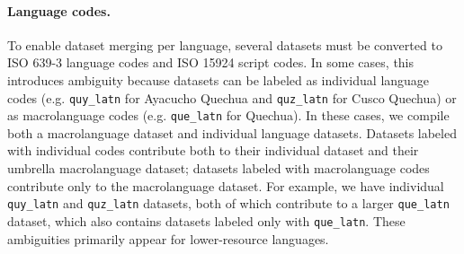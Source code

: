 \documentclass[11pt]{article}
\begin{document}
\paragraph{Language codes.}
To enable dataset merging per language, several datasets must be converted to ISO 639-3 language codes and ISO 15924 script codes.
In some cases, this introduces ambiguity because datasets can be labeled as individual language codes (e.g. \texttt{quy\_latn} for Ayacucho Quechua and \texttt{quz\_latn} for Cusco Quechua) or as macrolanguage codes (e.g. \texttt{que\_latn} for Quechua).
In these cases, we compile both a macrolanguage dataset and individual language datasets.
Datasets labeled with individual codes contribute both to their individual dataset and their umbrella macrolanguage dataset; datasets labeled with macrolanguage codes contribute only to the macrolanguage dataset.
For example, we have individual \texttt{quy\_latn} and \texttt{quz\_latn} datasets, both of which contribute to a larger \texttt{que\_latn} dataset, which also contains datasets labeled only with \texttt{que\_latn}.
These ambiguities primarily appear for lower-resource languages.
\end{document}
